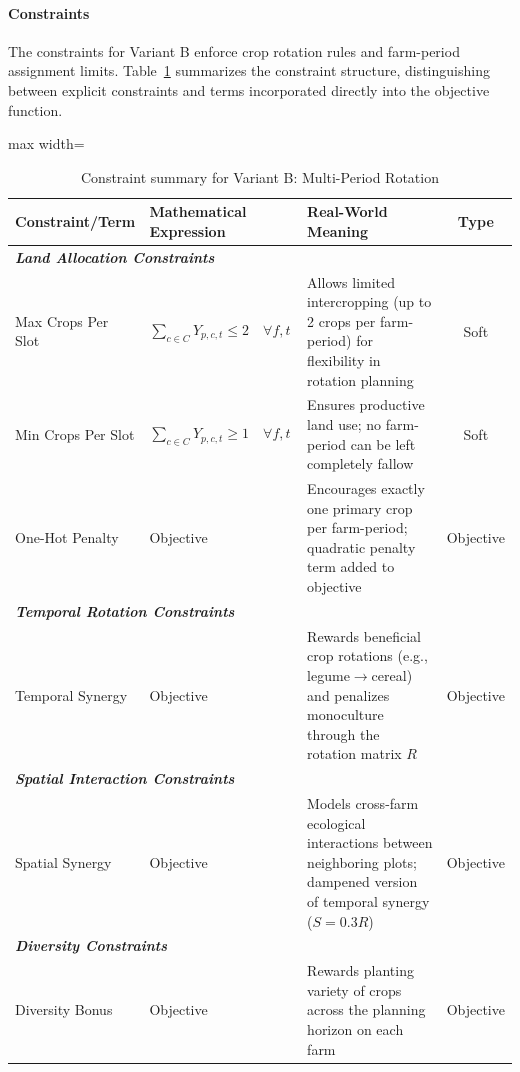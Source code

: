 \documentclass{oqireport}
\begin{document}
\paragraph{Constraints}

The constraints for Variant B enforce crop rotation rules and farm-period assignment limits. Table~\ref{tab:variant_b_constraints} summarizes the constraint structure, distinguishing between explicit constraints and terms incorporated directly into the objective function.


\begin{table}[H]
\centering
\caption{Constraint summary for Variant B: Multi-Period Rotation}
\label{tab:variant_b_constraints}
\small
\begin{adjustbox}{max width=\textwidth}
\begin{tabular}{@{}p{3.2cm}p{5cm}p{5cm}c@{}}
\toprule
\textbf{Constraint/Term} & \textbf{Mathematical Expression} & \textbf{Real-World Meaning} & \textbf{Type} \\
\midrule
\multicolumn{4}{l}{\textit{\textbf{Land Allocation Constraints}}} \\
\midrule
Max Crops Per Slot & $\sum_{c \in C} Y_{p,c,t} \leq 2 \quad \forall f,t$ & Allows limited intercropping (up to 2 crops per farm-period) for flexibility in rotation planning & Soft \\
\addlinespace
Min Crops Per Slot & $\sum_{c \in C} Y_{p,c,t} \geq 1 \quad \forall f,t$ & Ensures productive land use; no farm-period can be left completely fallow & Soft \\
\addlinespace
One-Hot Penalty & Objective & Encourages exactly one primary crop per farm-period; quadratic penalty term added to objective & Objective \\
\midrule
\multicolumn{4}{l}{\textit{\textbf{Temporal Rotation Constraints}}} \\
\midrule

Temporal Synergy & Objective & Rewards beneficial crop rotations (e.g., legume$\to$cereal) and penalizes monoculture through the rotation matrix $R$ & Objective \\
\midrule
\multicolumn{4}{l}{\textit{\textbf{Spatial Interaction Constraints}}} \\
\midrule
Spatial Synergy & Objective & Models cross-farm ecological interactions between neighboring plots; dampened version of temporal synergy ($S = 0.3R$) & Objective \\
\midrule
\multicolumn{4}{l}{\textit{\textbf{Diversity Constraints}}} \\
\midrule
Diversity Bonus & Objective & Rewards planting variety of crops across the planning horizon on each farm & Objective \\
\bottomrule
\end{tabular}
\end{adjustbox}
\end{table}
\end{document}
